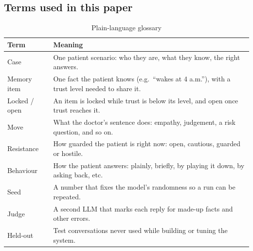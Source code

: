 \documentclass[10pt]{article}
\begin{document}
\subsection{Terms used in this paper}
\begin{table}[h]
\caption{Plain-language glossary}
\label{tab:glossary}
\centering
\footnotesize
\begin{tabularx}{\columnwidth}{@{}lY@{}}
\toprule
Term & Meaning\\
\midrule
Case & One patient scenario: who they are, what they know, the right answers.\\
Memory item & One fact the patient knows (e.g.\ ``wakes at 4 a.m.''), with a trust level needed to share it.\\
Locked / open & An item is locked while trust is below its level, and open once trust reaches it.\\
Move & What the doctor's sentence does: empathy, judgement, a risk question, and so on.\\
Resistance & How guarded the patient is right now: open, cautious, guarded or hostile.\\
Behaviour & How the patient answers: plainly, briefly, by playing it down, by asking back, etc.\\
Seed & A number that fixes the model's randomness so a run can be repeated.\\
Judge & A second LLM that marks each reply for made-up facts and other errors.\\
Held-out & Test conversations never used while building or tuning the system.\\
\bottomrule
\end{tabularx}
\end{table}
\end{document}
